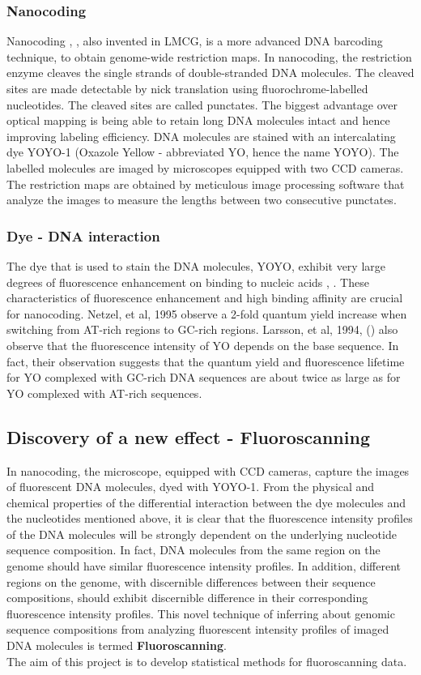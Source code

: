 \subsubsection*{Nanocoding}
Nanocoding \cite{Jo_etal_2007_PNAS}, \cite{Jo_etal_2009}, also invented in LMCG, is a more advanced DNA barcoding technique, to obtain genome-wide restriction maps. In nanocoding, the restriction enzyme cleaves the single strands of double-stranded DNA molecules. The cleaved sites are made detectable by nick translation using fluorochrome-labelled nucleotides. The cleaved sites are called punctates. The biggest advantage over optical mapping is being able to retain long DNA molecules intact and hence improving labeling efficiency. DNA molecules are stained with an intercalating dye YOYO-1 (Oxazole Yellow - abbreviated YO, hence the name YOYO). The labelled molecules are imaged by microscopes equipped with two CCD cameras. The restriction maps are obtained by meticulous image processing software that analyze the images to measure the lengths between two consecutive punctates. 

\subsubsection*{Dye - DNA interaction} 
The dye that is used to stain the DNA molecules, YOYO, exhibit very large degrees of fluorescence enhancement on binding to nucleic acids \cite{Rye_etal_1992_NAR}, \cite{Lee_etal_1986_Cytometry}. These  characteristics of fluorescence enhancement and  high binding affinity are crucial for nanocoding. Netzel, et al, 1995 \cite{Netzel_etal_1995_JPC} observe a 2-fold quantum yield increase when switching from AT-rich regions to GC-rich regions. Larsson, et al, 1994, (\cite{Larsson_etal_1994_JACS}) also observe that the fluorescence intensity of YO depends on the base sequence. In fact, their observation suggests that the quantum yield and fluorescence lifetime for YO complexed with GC-rich DNA sequences are about twice as large as for YO complexed with AT-rich sequences. 

\subsection{Discovery of a new effect - Fluoroscanning}
In nanocoding, the microscope, equipped with CCD cameras, capture the images of fluorescent DNA molecules, dyed with YOYO-1. From the physical and chemical properties of the differential interaction between the dye molecules and the nucleotides mentioned above, it is clear that the fluorescence intensity profiles of the DNA molecules will be strongly dependent on the underlying nucleotide sequence composition. In fact, DNA molecules from the same region on the genome should have similar fluorescence intensity profiles. In addition, different regions on the genome, with discernible differences between their sequence compositions, should exhibit discernible difference in their corresponding fluorescence intensity profiles. This novel technique of inferring about genomic sequence compositions from analyzing fluorescent intensity profiles of imaged DNA molecules is termed {\bf{Fluoroscanning}}. \\

The aim of this project is to develop statistical methods for fluoroscanning data. 
